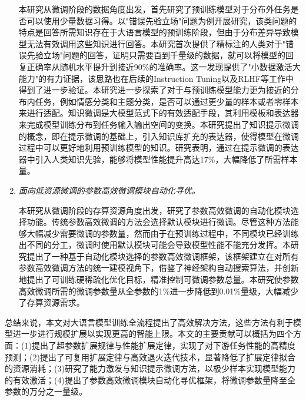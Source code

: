 \begin{enumerate}
本研究从微调阶段的数据角度出发，首先研究了预训练模型对于分布外任务是否可以使用少量数据习得。以"错误先验立场"问题为例开展研究，该类问题的特点是回答所需知识存在于大语言模型的预训练阶段，但由于分布差异导致模型无法有效调用这些知识进行回答。本研究首次提供了精标注的人类对于"错误先验立场"问题的回答，证明只需要百到千量级的数据，就可以将模型的回复正确率从随机水平提升到接近90\%的准确率。这一发现提供了"小数据激活大能力"的有力证据，该思路也在后续的Instruction Tuning以及RLHF等工作中得到了进一步验证。本研究进一步探索了对于与预训练模型能力更为接近的分布内任务，例如情感分类和主题分类，是否可以通过更少量的样本或者零样本来进行适配。知识微调是大模型范式下的有效适配手段，其利用模板和表达器来完成模型训练分布到任务输入输出空间的变换。本研究提出了知识提示微调的概念，即在提示微调的基础上，引入知识库扩充的表达器，使得模型在微调过程中可以更好地利用预训练模型的知识。研究表明，通过在提示微调的表达器中引入人类知识先验，能够将模型性能提升高达17\%，大幅降低了所需样本量。

\item \textit{面向低资源微调的参数高效微调模块自动化寻优。} 

本研究从微调阶段的存算资源角度出发，研究了参数高效微调的自动化模块选择功能。传统参数高效微调的方法会选择默认模块进行微调。尽管这种方法能够大幅减少需要微调的参数量，然而由于在预训练过程中，不同模块已经训练出不同的分工，微调时使用默认模块可能会导致模型性能不能充分发挥。本研究提出了一种基于自动化模块选择的参数高效微调框架，该框架建立在对所有参数高效微调方法的统一建模视角下，借鉴了神经架构自动搜索算法，并创新地提出了可训练硬稀疏化优化目标，精准控制可微调参数总量。本研究使参数高效微调所需的微调参数量从全参数的1\%进一步降低到0.01\%量级，大幅减少了存算资源需求。

\end{enumerate}

总结来说，本文对大语言模型训练全流程提出了高效解决方法，这些方法有利于模型进一步进行规模扩展以实现更高的智能上限。本文的主要贡献可以概括为四个方面：(1)提出了超参数扩展规律与性能扩展定律，实现了对下游任务性能的高精度预测；(2)提出了可复用扩展定律与高效退火迭代技术，显著降低了扩展定律拟合的资源消耗；(3)研究了能力激发与知识提示微调方法，以极少样本实现模型能力的有效激活；(4)提出了参数高效微调模块自动化寻优框架，将微调参数量降至全参数的万分之一量级。

